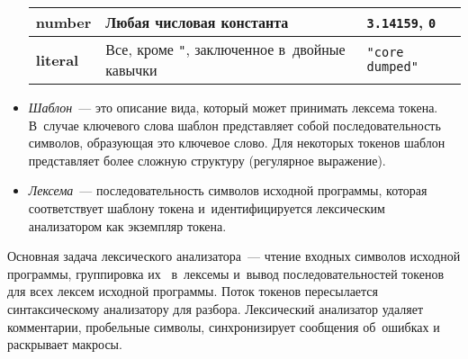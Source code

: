 \begin{itemize}
{\begin{table} [h!tbp]
\begin{tabular}{| p{3cm} | p{6cm} | p{5cm} |}
				\textbf{number}  	& 	Любая числовая константа													& 	\texttt{3.14159}, \texttt{0} 				\\ \hline
				\textbf{literal}  	& 	Все, кроме \texttt{"}, заключенное в~двойные кавычки 						& 	\texttt{"core dumped"} 						\\ \hline	
			\end{tabular}
		\end{table}	
	}
	\item{\textit{Шаблон}~--- это описание вида, который может принимать лексема токена. В~случае ключевого слова шаблон представляет собой последовательность символов, образующая это ключевое слово. Для некоторых токенов шаблон представляет более сложную структуру (регулярное выражение).}
	\item{\textit{Лексема}~--- последовательность символов исходной программы, которая соответствует шаблону токена и~идентифицируется лексическим анализатором как экземпляр токена.}
\end{itemize}

Основная задача лексического анализатора~--- чтение входных символов исходной программы, группировка их ~в~лексемы и~вывод последовательностей токенов для всех лексем исходной программы. Поток токенов пересылается синтаксическому анализатору для разбора. Лексический анализатор удаляет комментарии, пробельные символы, синхронизирует сообщения об~ошибках и раскрывает макросы.